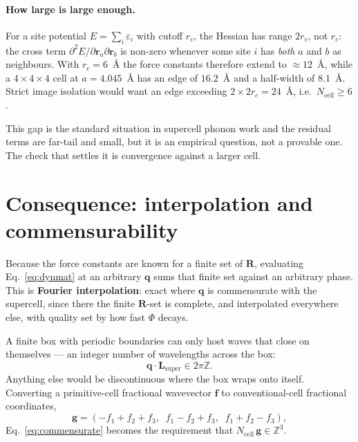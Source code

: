 \documentclass[11pt]{article}
\begin{document}
\paragraph{How large is large enough.} For a site potential
$E = \sum_i \varepsilon_i$ with cutoff $r_c$, the Hessian has range $2r_c$, not
$r_c$: the cross term $\partial^2 E/\partial\bm r_a\partial\bm r_b$ is non-zero
whenever some site $i$ has \emph{both} $a$ and $b$ as neighbours. With
$r_c = 6$~\AA{} the force constants therefore extend to $\approx12$~\AA, while a
$4\times4\times4$ cell at $a = 4.045$~\AA{} has an edge of $16.2$~\AA{} and a
half-width of $8.1$~\AA. Strict image isolation would want an edge exceeding
$2\times 2r_c = 24$~\AA, i.e.\ $N_{\mathrm{cell}}\ge6$.

This gap is the standard situation in supercell phonon work and the residual
terms are far-tail and small, but it is an empirical question, not a provable
one. The check that settles it is convergence against a larger cell.

\section{Consequence: interpolation and commensurability}
\label{sec:commensurate}

Because the force constants are known for a finite set of $\bm R$, evaluating
Eq.~\eqref{eq:dynmat} at an arbitrary $\bm q$ sums that finite set against an
arbitrary phase. This is \textbf{Fourier interpolation}: exact where $\bm q$ is
commensurate with the supercell, since there the finite $\bm R$-set is complete,
and interpolated everywhere else, with quality set by how fast $\Phi$ decays.

A finite box with periodic boundaries can only host waves that close on
themselves --- an integer number of wavelengths across the box:
%
\begin{equation}
\bm q\cdot\bm L_{\mathrm{super}} \in 2\pi\mathbb{Z}.
\label{eq:commensurate}
\end{equation}
%
Anything else would be discontinuous where the box wraps onto itself. Converting
a primitive-cell fractional wavevector $\bm f$ to conventional-cell fractional
coordinates,
%
\begin{equation}
\bm g = (-f_1+f_2+f_3,\;\; f_1-f_2+f_3,\;\; f_1+f_2-f_3),
\end{equation}
%
Eq.~\eqref{eq:commensurate} becomes the requirement that
$N_{\mathrm{cell}}\,\bm g \in \mathbb{Z}^3$.
\end{document}
